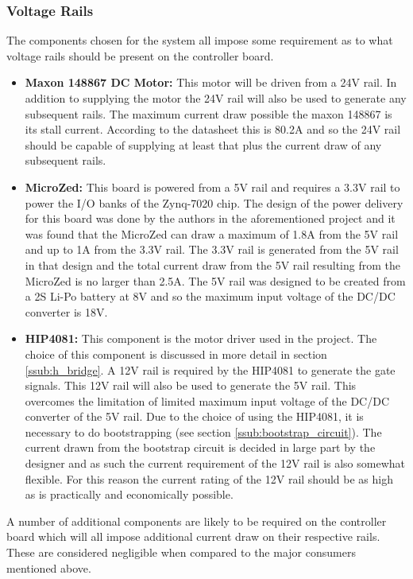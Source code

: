 \subsubsection{Voltage Rails}
The components chosen for the system all impose some requirement as to what voltage rails should be present on the controller board.
\begin{itemize}
	\item \textbf{Maxon 148867 DC Motor:} This motor will be driven from a 24V rail.
	In addition to supplying the motor the 24V rail will also be used to generate any subsequent rails.
	The maximum current draw possible the maxon 148867 is its stall current. 
	According to the datasheet this is 80.2A and so the 24V rail should be capable of supplying at least that plus the current draw of any subsequent rails.
	\item  \textbf{MicroZed:} This board is powered from a 5V rail and requires a 3.3V rail to power the I/O banks of the Zynq-7020 chip.
	The design of the power delivery for this board was done by the authors in the aforementioned project \cite{isaswarm} and it was found that the MicroZed can draw a maximum of 1.8A from the 5V rail and up to 1A from the 3.3V rail.
	The 3.3V rail is generated from the 5V rail in that design and the total current draw from the 5V rail resulting from the MicroZed is no larger than 2.5A.
	The 5V rail was designed to be created from a 2S Li-Po battery at 8V and so the maximum input voltage of the DC/DC converter is 18V. 
	\item \textbf{HIP4081:} This component is the motor driver used in the project.
	The choice of this component is discussed in more detail in section \ref{ssub:h_bridge}.
	A 12V rail is required by the HIP4081 to generate the gate signals.
	This 12V rail will also be used to generate the 5V rail.
	This overcomes the limitation of limited maximum input voltage of the DC/DC converter of the 5V rail.
	Due to the choice of using the HIP4081, it is necessary to do bootstrapping (see section \ref{ssub:bootstrap_circuit}). 
	The current drawn from the bootstrap circuit is decided in large part by the designer and as such the current requirement of the 12V rail is also somewhat flexible.
	For this reason the current rating of the 12V rail should be as high as is practically and economically possible.
\end{itemize}
A number of additional components are likely to be required on the controller board which will all impose additional current draw on their respective rails.
These are considered negligible when compared to the major consumers mentioned above.
 
